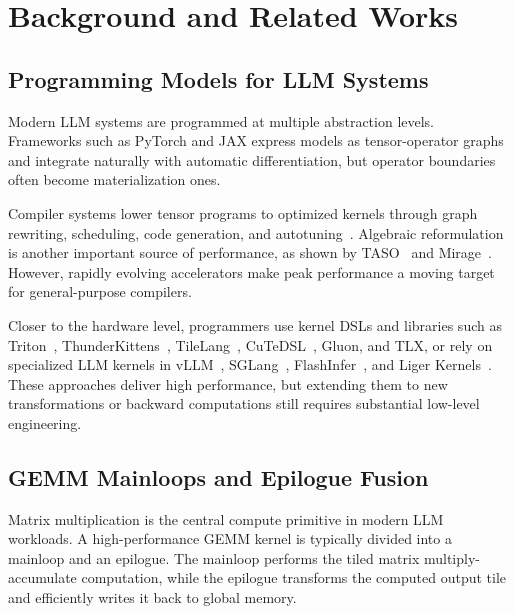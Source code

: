 \section{Background and Related Works}












\subsection{Programming Models for LLM Systems}
\label{sec:background-programming-model}

Modern LLM systems are programmed at multiple abstraction levels. Frameworks such as PyTorch and JAX express models as tensor-operator graphs and integrate naturally with automatic differentiation, but operator boundaries often become materialization ones.

Compiler systems lower tensor programs to optimized kernels through graph rewriting, scheduling, code generation, and autotuning~\cite{ansel2024pytorch,chen2018tvm,tillet2019triton}. Algebraic reformulation is another important source of performance, as shown by TASO~\cite{jia2019taso} and Mirage~\cite{wu2025mirage}. However, rapidly evolving accelerators make peak performance a moving target for general-purpose compilers.

Closer to the hardware level, programmers use kernel DSLs and libraries such as Triton~\cite{tillet2019triton}, ThunderKittens~\cite{spector2024thunderkittens,spector2025look,sul2025parallelkittens}, TileLang~\cite{wang2025tilelang}, CuTeDSL~\cite{Thakkar_CUTLASS_2023}, Gluon, and TLX, or rely on specialized LLM kernels in vLLM~\cite{kwon2023efficient}, SGLang~\cite{zheng2024sglang}, FlashInfer~\cite{ye2025flashinfer}, and Liger Kernels~\cite{hsu2024liger}. These approaches deliver high performance, but extending them to new transformations or backward computations still requires substantial low-level engineering.

\subsection{GEMM Mainloops and Epilogue Fusion}
\label{sec:background-gemm-epilogue}

Matrix multiplication is the central compute primitive in modern LLM workloads. A high-performance GEMM kernel is typically divided into a mainloop and an epilogue. The mainloop performs the tiled matrix multiply-accumulate computation, while the epilogue transforms the computed output tile and efficiently writes it back to global memory.

